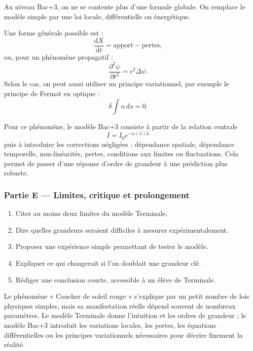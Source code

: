 \documentclass[11pt,a4paper]{article}
\begin{document}
\begin{approfondissementbox}
Au niveau Bac+3, on ne se contente plus d'une formule globale. On remplace le modèle simple par une loi locale, différentielle ou énergétique.

Une forme générale possible est :
\[
\frac{\mathrm d X}{\mathrm dt}=\text{apport}-\text{pertes},
\]
ou, pour un phénomène propagatif :
\[
\frac{\partial^2 \psi}{\partial t^2}=c^2\Delta\psi.
\]
Selon le cas, on peut aussi utiliser un principe variationnel, par exemple le principe de Fermat en optique :
\[
\delta \int n\,\mathrm ds=0.
\]

Pour ce phénomène, le modèle Bac+3 consiste à partir de la relation centrale
\[
I=I_0e^{-\alpha(\lambda)L}
\]
puis à introduire les corrections négligées : dépendance spatiale, dépendance temporelle, non-linéarités, pertes, conditions aux limites ou fluctuations. Cela permet de passer d'une réponse d'ordre de grandeur à une prédiction plus robuste.
\end{approfondissementbox}

\subsubsection*{Partie E — Limites, critique et prolongement}

\begin{enumerate}
  \item Citer au moins deux limites du modèle Terminale.
  \item Dire quelles grandeurs seraient difficiles à mesurer expérimentalement.
  \item Proposer une expérience simple permettant de tester le modèle.
  \item Expliquer ce qui changerait si l'on doublait une grandeur clé.
  \item Rédiger une conclusion courte, accessible à un élève de Terminale.
\end{enumerate}

\begin{corrigebox}
Le phénomène « Coucher de soleil rouge » s'explique par un petit nombre de lois physiques simples, mais sa manifestation réelle dépend souvent de nombreux paramètres. Le modèle Terminale donne l'intuition et les ordres de grandeur ; le modèle Bac+3 introduit les variations locales, les pertes, les équations différentielles ou les principes variationnels nécessaires pour décrire finement la réalité.
\end{corrigebox}
\end{document}
